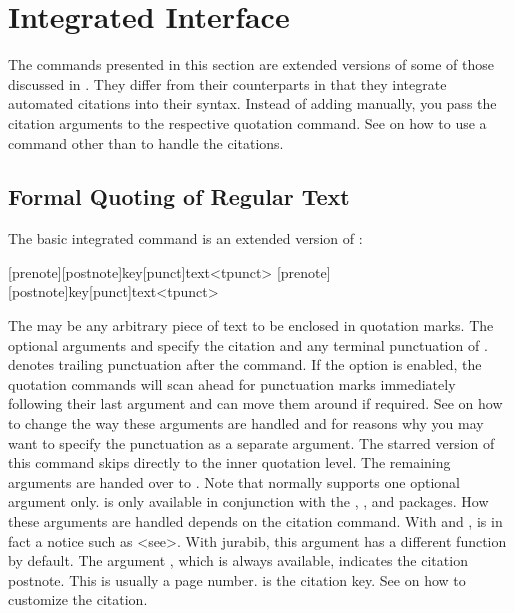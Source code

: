 \documentclass{ltxdockit}[2010/09/26]
\begin{document}
\section{Integrated Interface}
\label{cit}

The commands presented in this section are extended versions of some of those discussed in . They differ from their counterparts in that they integrate automated citations into their syntax. Instead of adding  manually, you pass the citation arguments to the respective quotation command. See  on how to use a command other than  to handle the citations.

\subsection{Formal Quoting of Regular Text}
\label{int:txt:reg}

The basic integrated command is an extended version of :

\begin{ltxsyntax}

[prenote][postnote]{key}[punct]{text}<tpunct>
[prenote][postnote]{key}[punct]{text}<tpunct>

The  may be any arbitrary piece of text to be enclosed in quotation marks. The optional arguments  and  specify the citation and any terminal punctuation of .  denotes trailing punctuation after the command. If the  option is enabled, the quotation commands will scan ahead for punctuation marks immediately following their last argument and can move them around if required. See  on how to change the way these arguments are handled and  for reasons why you may want to specify the punctuation as a separate argument. The starred version of this command skips directly to the inner quotation level. The remaining arguments are handed over to . Note that  normally supports one optional argument only.  is only available in conjunction with the , , and  packages. How these arguments are handled depends on the citation command. With  and ,  is in fact a notice such as <see>. With jurabib, this argument has a different function by default. The argument , which is always available, indicates the citation postnote. This is usually a page number.  is the citation key. See  on how to customize the citation.

\end{ltxsyntax}
\end{document}
